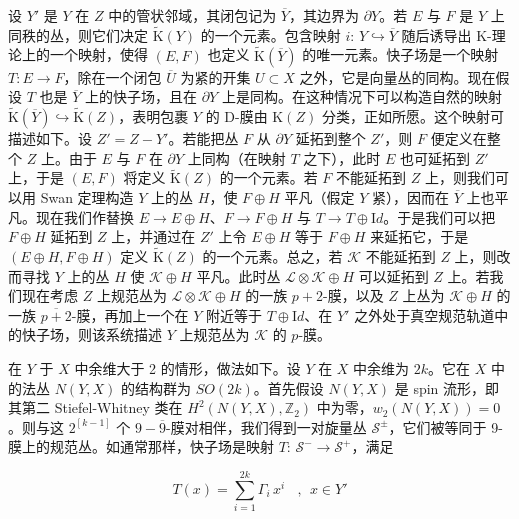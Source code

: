 \documentclass[11pt,a4paper]{ctexart}
\begin{document}
设 \(Y'\) 是 \(Y\) 在 \(Z\) 中的管状邻域，其闭包记为 \(\overline{Y}\)，其边界为 \(\partial Y\)。若 \(E\) 与 \(F\) 是 \(Y\) 上同秩的丛，则它们决定 \(\widetilde{{\mathrm K}}(Y)\) 的一个元素。包含映射 \(i:\,Y\hookrightarrow\overline{Y}\) 随后诱导出 K-理论上的一个映射，使得 \((E,F)\) 也定义 \(\widetilde{{\mathrm K}}(\overline{Y})\) 的唯一元素。快子场是一个映射 \(T:E\longrightarrow F\)，除在一个闭包 \(\overline{U}\) 为紧的开集 \(U\subset X\) 之外，它是向量丛的同构。现在假设 \(T\) 也是 \(\overline{Y}\) 上的快子场，且在 \(\partial{Y}\) 上是同构。在这种情况下可以构造自然的映射 \(\widetilde{{\mathrm K}}(\overline{Y})\hookrightarrow\widetilde{{\mathrm K}}(Z)\)，表明包裹 \(Y\) 的 D-膜由 \({\mathrm K}(Z)\) 分类，正如所愿。这个映射可描述如下。设 \(Z'=Z-Y'\)。若能把丛 \(F\) 从 \(\partial Y\) 延拓到整个 \(Z'\)，则 \(F\) 便定义在整个 \(Z\) 上。由于 \(E\) 与 \(F\) 在 \(\partial Y\) 上同构（在映射 \(T\) 之下），此时 \(E\) 也可延拓到 \(Z'\) 上，于是 \((E,F)\) 将定义 \(\widetilde{{\mathrm K}}(Z)\) 的一个元素。若 \(F\) 不能延拓到 \(Z\) 上，则我们可以用 Swan 定理构造 \(Y\) 上的丛 \(H\)，使 \(F\oplus H\) 平凡（假定 \(Y\) 紧），因而在 \(\overline{Y}\) 上也平凡。现在我们作替换 \(E\rightarrow E\oplus H\)、\(F\rightarrow F\oplus H\) 与 \(T\rightarrow T\oplus{\mathrm Id}\)。于是我们可以把 \(F\oplus H\) 延拓到 \(Z\) 上，并通过在 \(Z'\) 上令 \(E\oplus H\) 等于 \(F\oplus H\) 来延拓它，于是 \((E\oplus H, F\oplus H)\) 定义 \(\widetilde{{\mathrm K}}(Z)\) 的一个元素。总之，若 \({\mathcal K}\) 不能延拓到 \(Z\) 上，则改而寻找 \(Y\) 上的丛 \(H\) 使 \({\mathcal K}\oplus H\) 平凡。此时丛 \({\mathcal L}\otimes{\mathcal K}\oplus H\) 可以延拓到 \(Z\) 上。若我们现在考虑 \(Z\) 上规范丛为 \({\mathcal L}\otimes{\mathcal K}\oplus H\) 的一族 \(p+2\)-膜，以及 \(Z\) 上丛为 \({\mathcal K}\oplus H\) 的一族 \(\overline{p+2}\)-膜，再加上一个在 \(Y\) 附近等于 \(T\oplus{\mathrm Id}\)、在 \(Y'\) 之外处于真空规范轨道中的快子场，则该系统描述 \(Y\) 上规范丛为 \({\mathcal K}\) 的 \(p\)-膜。

在 \(Y\) 于 \(X\) 中余维大于 2 的情形，做法如下。设 \(Y\) 在 \(X\) 中余维为 \(2k\)。它在 \(X\) 中的法丛 \(N(Y,X)\) 的结构群为 \(SO(2k)\)。首先假设 \(N(Y,X)\) 是 spin 流形，即其第二 Stiefel-Whitney 类在 \(H^2(N(Y,X),{\mathbb{Z}}_2)\) 中为零，\(w_2(N(Y,X))=0\)。则与这 \(2^[k-1]\) 个 \(9-\overline{9}\)-膜对相伴，我们得到一对旋量丛 \({\mathcal S}^{\pm}\)，它们被等同于 9-膜上的规范丛。如通常那样，快子场是映射 \(T:\, {\mathcal S}^-\rightarrow {\mathcal S}^+\)，满足

\[T(x)=\sum_{i=1}^{2k}\Gamma_i\, x^i\ \ \ \ , \ \ x\in Y'\]
\end{document}
